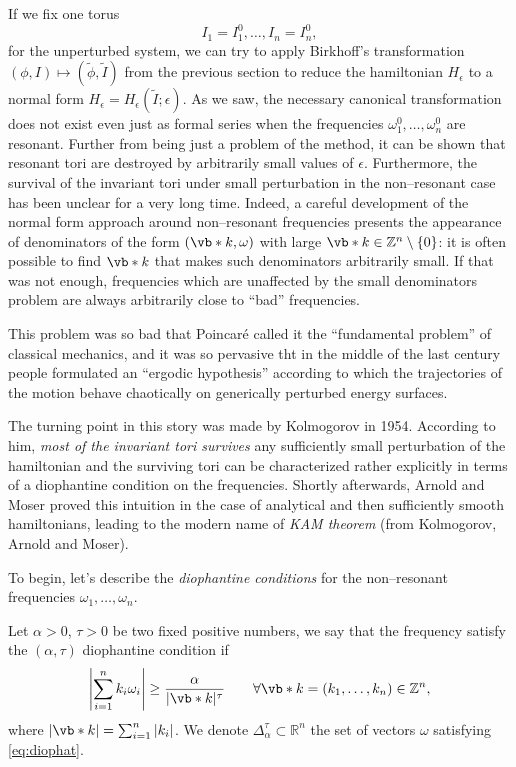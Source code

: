 \documentclass[english,fontsize=11pt,paper=b5]{scrbook}
\theoremstyle{definition}
\begin{document}
      If we fix one torus
      \begin{equation}
        I_1 = I_1^0, \ldots, I_n = I_n^0,
      \end{equation}
      for the unperturbed system, we can try to apply Birkhoff's transformation $(\phi, I)\mapsto(\widetilde\phi,\widetilde I)$ from the previous section to reduce the hamiltonian $H_\epsilon$ to a normal form $H_\epsilon = H_\epsilon(\widetilde I; \epsilon)$.
      As we saw, the necessary canonical transformation does not exist even just as formal series when the frequencies $\omega_1^0, \ldots, \omega_n^0$ are resonant.
      Further from being just a problem of the method, it can be shown that resonant tori are destroyed by arbitrarily small values of $\epsilon$.
      Furthermore, the survival of the invariant tori under small perturbation in the non--resonant case has been unclear for a very long time. Indeed, a careful development of the normal form approach around non--resonant frequencies presents the appearance of denominators of the form $(\vb* k, \omega)$ with large $\vb* k \in\mathbb{Z}^n\setminus\{0\}$: it is often possible to find $\vb* k$ that makes such denominators arbitrarily small. If that was not enough, frequencies which are unaffected by the small denominators problem are always arbitrarily close to ``bad'' frequencies.

      This problem was so bad that Poincar\'e called it the ``fundamental problem'' of classical mechanics, and it was so pervasive tht in the middle of the last century people formulated an ``ergodic hypothesis'' according to which the trajectories of the motion behave chaotically on generically perturbed energy surfaces.

      The turning point in this story was made by Kolmogorov in 1954.
      According to him, \emph{most of the invariant tori survives} any sufficiently small perturbation of the hamiltonian and the surviving tori can be characterized rather explicitly in terms of a diophantine condition on the frequencies.
      Shortly afterwards, Arnold and Moser proved this intuition in the case of analytical and then sufficiently smooth hamiltonians,
      leading to the modern name of \emph{KAM theorem} (from Kolmogorov, Arnold and Moser).

      To begin, let's describe the \emph{diophantine conditions} for the non--resonant frequencies $\omega_1, \ldots, \omega_n$.

      \begin{tcolorbox}
        Let $\alpha>0$, $\tau>0$ be two fixed positive numbers, we say that the frequency satisfy the $(\alpha,\tau)$ diophantine condition if
        \begin{equation}\label{eq:diophat}
          \left|\sum_{i=1}^n k_i \omega_i \right| \geq \frac{\alpha}{|\vb* k|^\tau} \qquad \forall \vb* k=(k_1, \ldots, k_n)\in\mathbb{Z}^n,
        \end{equation}
        where $|\vb* k| = \sum_{i=1}^n |k_i|$.
        We denote $\Delta_\alpha^\tau\subset\mathbb{R}^n$ the set of vectors $\omega$ satisfying \eqref{eq:diophat}.
      \end{tcolorbox}
\end{document}
